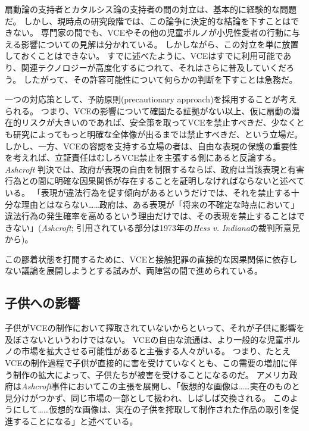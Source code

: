 \documentclass[paper=a4,book,openany]{jlreq}
\begin{document}
扇動論の支持者とカタルシス論の支持者の間の対立は、基本的に経験的な問題だ。
しかし、現時点の研究段階では、この論争に決定的な結論を下すことはできない。
専門家の間でも、VCEやその他の児童ポルノが小児性愛者の行動に与える影響についての見解は分かれている\citep{ost02:_child_risk, quayle02:_child_pornog_inter, endrass09:_consum_inter_child_pornog_violen_sex_offen, seto11:_contac_sexual_offen_men_onlin, hessick11:_disen_child_pornog_child_sex_abuse}。
しかしながら、この対立を単に放置しておくことはできない。
すでに述べたように、VCEはすでに利用可能であり、関連テクノロジーが高度化するにつれて、それはさらに普及していくだろう。
したがって、その許容可能性について何らかの判断を下すことは急務だ。

一つの対応策として、予防原則(precautionary approach)を採用することが考えられる。
つまり、VCEの影響について確固たる証拠がない以上、仮に扇動の潜在的リスクが大きいのであれば、安全策を取ってVCEを禁止すべきだ、少なくとも研究によってもっと明確な全体像が出るまでは禁止すべきだ、という立場だ。
しかし、一方、VCEの容認を支持する立場の者は、自由な表現の保護の重要性を考えれば、立証責任はむしろVCE禁止を主張する側にあると反論する。
\emph{Ashcroft} 判決では、政府が表現の自由を制限するならば、政府は当該表現と有害行為との間に明確な因果関係が存在することを証明しなければならないと述べている。
「表現が違法行為を促す傾向があるというだけでは、それを禁止する十分な理由とはならない……政府は、ある表現が「将来の不確定な時点において」違法行為の発生確率を高めるという理由だけでは、その表現を禁止することはできない」(\emph{Ashcroft}; 引用されている部分は1973年の\emph{Hess v. Indiana}の裁判所意見から)。

この膠着状態を打開するために、VCEと接触犯罪の直接的な因果関係に依存しない議論を展開しようとする試みが、両陣営の間で進められている。

\subsection{子供への影響}

子供がVCEの制作において搾取されていないからといって、それが子供に影響を及ぼさないというわけではない。
VCEの自由な流通は、より一般的な児童ポルノの市場を拡大させる可能性があると主張する人々がいる。
つまり、たとえVCEの制作過程で子供が直接的に害を受けていなくとも、この需要の増加に伴う制作の拡大によって、子供たちが被害を受けることになるのだ。
アメリカ政府は\emph{Ashcroft}事件においてこの主張を展開し、「仮想的な画像は……実在のものと見分けがつかず、同じ市場の一部として扱われ、しばしば交換される。
このようにして……仮想的な画像は、実在の子供を搾取して制作された作品の取引を促進することになる」と述べている。
\end{document}
